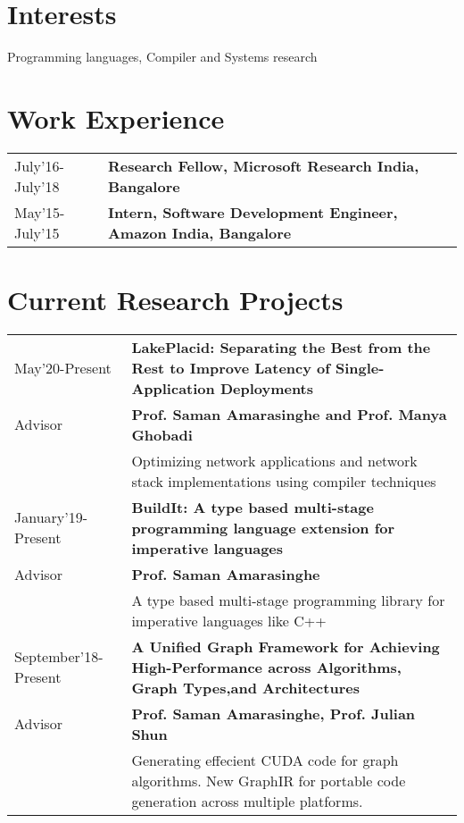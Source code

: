\documentclass[10pt]{article}
\newcommand \VRule{}
\begin{document}
\section*{Interests}
Programming languages, Compiler and Systems research


\section*{Work Experience}
\begin{tabular}{l!{\VRule}p{15cm}}
July'16-July'18 & {\bf Research Fellow, Microsoft Research India, Bangalore } \\
May'15-July'15 & {\bf Intern, Software Development Engineer, Amazon India, Bangalore } \\
\end{tabular}

\section*{Current Research Projects}
\begin{longtable}{l!{\VRule} p{15cm} }
May'20-Present & {\bf LakePlacid: Separating the Best from the Rest to Improve Latency of Single-Application Deployments} \\
Advisor & {\bf Prof. Saman Amarasinghe and Prof. Manya Ghobadi} \\
 & Optimizing network applications and network stack implementations using compiler techniques \newline \\

January'19-Present & {\bf BuildIt: A type based multi-stage programming language extension for imperative languages} \\
Advisor       & {\bf Prof. Saman Amarasinghe} \\
 & A type based multi-stage programming library for imperative languages like C++ \newline \\

September'18-Present & {\bf A Unified Graph Framework for Achieving High-Performance across Algorithms, Graph Types,and Architectures} \\ 
Advisor       & {\bf Prof. Saman Amarasinghe, Prof. Julian Shun} \\ 
 & Generating effecient CUDA code for graph algorithms. New GraphIR for portable code generation across multiple platforms. \newline \\ 
\end{longtable}
\end{document}
